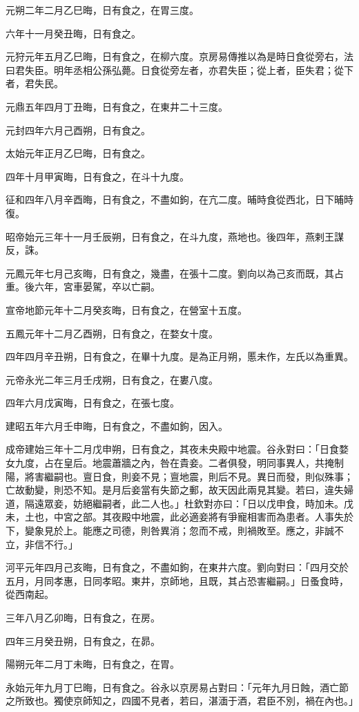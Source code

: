 \begin{pinyinscope}
元朔二年二月乙巳晦，日有食之，在胃三度。

六年十一月癸丑晦，日有食之。

元狩元年五月乙巳晦，日有食之，在柳六度。京房易傳推以為是時日食從旁右，法曰君失臣。明年丞相公孫弘薨。日食從旁左者，亦君失臣；從上者，臣失君；從下者，君失民。

元鼎五年四月丁丑晦，日有食之，在東井二十三度。

元封四年六月己酉朔，日有食之。

太始元年正月乙巳晦，日有食之。

四年十月甲寅晦，日有食之，在斗十九度。

征和四年八月辛酉晦，日有食之，不盡如鉤，在亢二度。晡時食從西北，日下晡時復。

昭帝始元三年十一月壬辰朔，日有食之，在斗九度，燕地也。後四年，燕剌王謀反，誅。

元鳳元年七月己亥晦，日有食之，幾盡，在張十二度。劉向以為己亥而既，其占重。後六年，宮車晏駕，卒以亡嗣。

宣帝地節元年十二月癸亥晦，日有食之，在營室十五度。

五鳳元年十二月乙酉朔，日有食之，在婺女十度。

四年四月辛丑朔，日有食之，在畢十九度。是為正月朔，慝未作，左氏以為重異。

元帝永光二年三月壬戌朔，日有食之，在婁八度。

四年六月戊寅晦，日有食之，在張七度。

建昭五年六月壬申晦，日有食之，不盡如鉤，因入。

成帝建始三年十二月戊申朔，日有食之，其夜未央殿中地震。谷永對曰：「日食婺女九度，占在皇后。地震蕭牆之內，咎在貴妾。二者俱發，明同事異人，共掩制陽，將害繼嗣也。亶日食，則妾不見；亶地震，則后不見。異日而發，則似殊事；亡故動變，則恐不知。是月后妾當有失節之郵，故天因此兩見其變。若曰，違失婦道，隔遠眾妾，妨絕繼嗣者，此二人也。」杜欽對亦曰：「日以戊申食，時加未。戊未，土也，中宮之部。其夜殿中地震，此必適妾將有爭寵相害而為患者。人事失於下，變象見於上。能應之司德，則咎異消；忽而不戒，則禍敗至。應之，非誠不立，非信不行。」

河平元年四月己亥晦，日有食之，不盡如鉤，在東井六度。劉向對曰：「四月交於五月，月同孝惠，日同孝昭。東井，京師地，且既，其占恐害繼嗣。」日蚤食時，從西南起。

三年八月乙卯晦，日有食之，在房。

四年三月癸丑朔，日有食之，在昴。

陽朔元年二月丁未晦，日有食之，在胃。

永始元年九月丁巳晦，日有食之。谷永以京房易占對曰：「元年九月日蝕，酒亡節之所致也。獨使京師知之，四國不見者，若曰，湛湎于酒，君臣不別，禍在內也。」


\end{pinyinscope}
